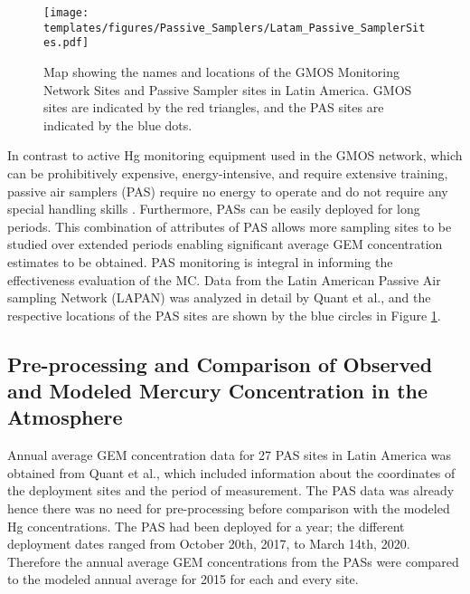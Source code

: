 \begin{figure}[H]
 \centering
  \texttt{[image: templates/figures/Passive\_Samplers/Latam\_Passive\_SamplerSites.pdf]}
  \caption[Map showing the names and locations of the GMOS Monitoring Network Sites and Passive Sampler sites in Latin America.]{Map showing the names and locations of the GMOS Monitoring Network Sites and Passive Sampler sites in Latin America. GMOS sites are indicated by the red triangles, and the PAS sites are indicated by the blue dots\cite{quant_measuring_2021,koenig_seasonal_2021}.}
  \label{fig:Latam_Passive_SamplerSites}
\end{figure}
\FloatBarrier

\begin{flushleft}
    In contrast to active Hg monitoring equipment used in the GMOS network, which can be prohibitively expensive, energy-intensive, and require extensive training, passive air samplers (PAS) require no energy to operate and do not require any special handling skills \cite{quant_measuring_2021}. Furthermore, PASs can be easily deployed for long periods. This combination of attributes of PAS allows more sampling sites to be studied over extended periods enabling significant average GEM concentration estimates to be obtained. PAS monitoring is integral in informing the effectiveness evaluation of the MC\cite{gustin_measuring_2015,unep_guidance_2021}. Data from the Latin American Passive Air sampling Network (LAPAN) was analyzed in detail by Quant et al.\cite{quant_measuring_2021}, and the respective locations of the PAS sites are shown by the blue circles in Figure \ref{fig:Latam_Passive_SamplerSites}.  
\end{flushleft}

\subsection{Pre-processing and Comparison of Observed and Modeled Mercury Concentration in the Atmosphere}\label{c2_observation_data_manipulation}
\begin{flushleft}
  Annual average GEM concentration data for 27 PAS sites in Latin America was obtained from Quant et al.\cite{quant_measuring_2021}, which included information about the coordinates of the deployment sites and the period of measurement. The PAS data was already \nang hence there was no need for pre-processing before comparison with the modeled Hg concentrations. The PAS had been deployed for a year; the different deployment dates ranged from October 20th, 2017, to March 14th, 2020. Therefore the annual average GEM concentrations from the PASs were compared to the modeled annual average \hg for 2015 for each and every site. 
  \end{flushleft}

